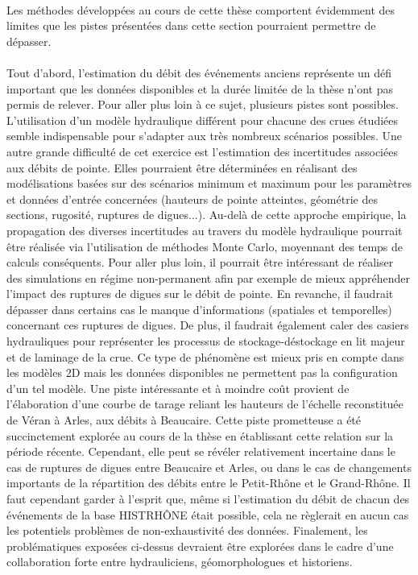 	
	\paragraph{} Les méthodes développées au cours de cette thèse comportent évidemment des limites que les pistes présentées dans cette section pourraient permettre de dépasser. 
	
	\paragraph{} Tout d'abord, l'estimation du débit des événements anciens représente un défi important que les données disponibles et la durée limitée de la thèse n'ont pas permis de relever. Pour aller plus loin à ce sujet, plusieurs pistes sont possibles. L'utilisation d'un modèle hydraulique différent pour chacune des crues étudiées semble indispensable pour s'adapter aux très nombreux scénarios possibles. Une autre grande difficulté de cet exercice est l'estimation des incertitudes associées aux débits de pointe. Elles pourraient être déterminées en réalisant des modélisations basées sur des scénarios minimum et maximum pour les paramètres et données d'entrée concernées (hauteurs de pointe atteintes, géométrie des sections, rugosité, ruptures de digues...). Au-delà de cette approche empirique, la propagation des diverses incertitudes au travers du modèle hydraulique pourrait être réalisée via l'utilisation de méthodes Monte Carlo, moyennant des temps de calculs conséquents. Pour aller plus loin, il pourrait être intéressant de réaliser des simulations en régime non-permanent afin par exemple de mieux appréhender l'impact des ruptures de digues sur le débit de pointe. En revanche, il faudrait dépasser dans certains cas le manque d'informations (spatiales et temporelles) concernant ces ruptures de digues. De plus, il faudrait également caler des casiers hydrauliques pour représenter les processus de stockage-déstockage en lit majeur et de laminage de la crue. Ce type de phénomène est mieux pris en compte dans les modèles 2D mais les données disponibles ne permettent pas la configuration d'un tel modèle. Une piste intéressante et à moindre coût provient de l'élaboration d'une courbe de tarage reliant les hauteurs de l'échelle reconstituée de Véran à Arles, aux débits à Beaucaire. Cette piste prometteuse a été succinctement explorée au cours de la thèse en établissant cette relation sur la période récente. Cependant, elle peut se révéler relativement incertaine dans le cas de ruptures de digues entre Beaucaire et Arles, ou dans le cas de changements importants de la répartition des débits entre le Petit-Rhône et le Grand-Rhône. Il faut cependant garder à l'esprit que, même si l'estimation du débit de chacun des événements de la base HISTRHÔNE était possible, cela ne règlerait en aucun cas les potentiels problèmes de non-exhaustivité des données. Finalement, les problématiques exposées ci-dessus devraient être explorées dans le cadre d'une collaboration forte entre hydrauliciens, géomorphologues et historiens.
	
